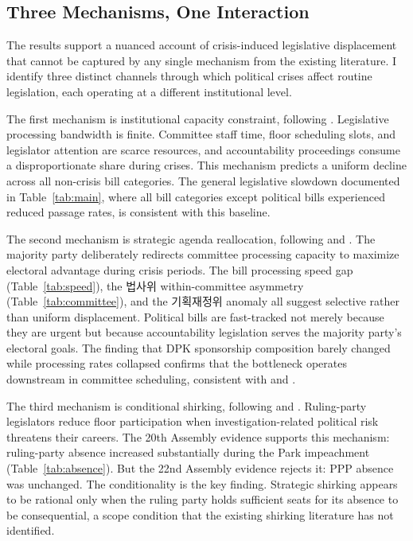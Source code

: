 \documentclass[11pt]{article}
\begin{document}
\subsection*{Three Mechanisms, One Interaction}

The results support a nuanced account of crisis-induced legislative displacement that cannot be captured by any single mechanism from the existing literature. I identify three distinct channels through which political crises affect routine legislation, each operating at a different institutional level.

The first mechanism is institutional capacity constraint, following \citet{baumgartner2009}. Legislative processing bandwidth is finite. Committee staff time, floor scheduling slots, and legislator attention are scarce resources, and accountability proceedings consume a disproportionate share during crises. This mechanism predicts a uniform decline across all non-crisis bill categories. The general legislative slowdown documented in Table~\ref{tab:main}, where all bill categories except political bills experienced reduced passage rates, is consistent with this baseline.

The second mechanism is strategic agenda reallocation, following \citet{cox2005} and \citet{petrocik1996}. The majority party deliberately redirects committee processing capacity to maximize electoral advantage during crisis periods. The bill processing speed gap (Table~\ref{tab:speed}), the 법사위 within-committee asymmetry (Table~\ref{tab:committee}), and the 기획재정위 anomaly all suggest selective rather than uniform displacement. Political bills are fast-tracked not merely because they are urgent but because accountability legislation serves the majority party's electoral goals. The finding that DPK sponsorship composition barely changed while processing rates collapsed confirms that the bottleneck operates downstream in committee scheduling, consistent with \citet{parkpy2026} and \citet{kimlee2026}.

The third mechanism is conditional shirking, following \citet{frank2021} and \citet{hoeyland2017}. Ruling-party legislators reduce floor participation when investigation-related political risk threatens their careers. The 20th Assembly evidence supports this mechanism: ruling-party absence increased substantially during the Park impeachment (Table~\ref{tab:absence}). But the 22nd Assembly evidence rejects it: PPP absence was unchanged. The conditionality is the key finding. Strategic shirking appears to be rational only when the ruling party holds sufficient seats for its absence to be consequential, a scope condition that the existing shirking literature has not identified.
\end{document}
